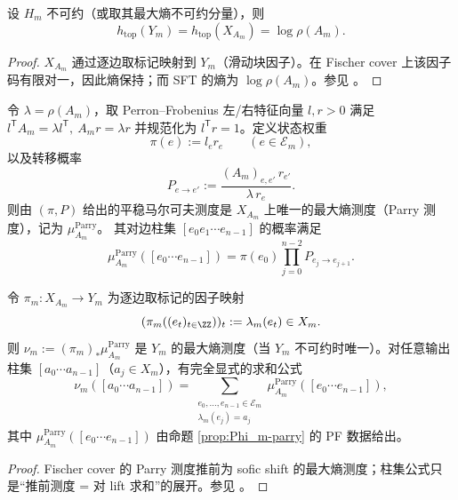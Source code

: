 \begin{proposition}[拓扑熵的可计算公式]\label{prop:Phi_m-entropy}
设 $H_m$ 不可约（或取其最大熵不可约分量），则
\[
h_{\mathrm{top}}(Y_m)=h_{\mathrm{top}}(X_{A_m})=\log\rho(A_m).
\]
\end{proposition}

\begin{proof}
$X_{A_m}$ 通过逐边取标记映射到 $Y_m$（滑动块因子）。在 Fischer cover 上该因子码有限对一，因此熵保持；而 SFT 的熵为 $\log\rho(A_m)$。参见 \cite{LindMarcus1995,Kitchens1998SymbolicDynamics}。
\end{proof}

\begin{proposition}\label{prop:Phi_m-parry}
令 $\lambda=\rho(A_m)$，取 Perron--Frobenius 左/右特征向量 $l,r>0$ 满足
\(
l^{\mathsf T}A_m=\lambda l^{\mathsf T},\ A_m r=\lambda r
\)
并规范化为 $l^{\mathsf T}r=1$。定义状态权重
\[
\pi(e):=l_e r_e\qquad (e\in\mathcal{E}_m),
\]
以及转移概率
\[
P_{e\to e'}:=\frac{(A_m)_{e,e'}\,r_{e'}}{\lambda\, r_e}.
\]
则由 $(\pi,P)$ 给出的平稳马尔可夫测度是 $X_{A_m}$ 上唯一的最大熵测度（Parry 测度），记为 $\mu_{A_m}^{\mathrm{Parry}}$。
其对边柱集 $[e_0e_1\cdots e_{n-1}]$ 的概率满足
\[
\mu_{A_m}^{\mathrm{Parry}}([e_0\cdots e_{n-1}])=\pi(e_0)\prod_{j=0}^{n-2} P_{e_j\to e_{j+1}}.
\]
\end{proposition}

\begin{proposition}\label{prop:Phi_m-parry-pushforward}
令 $\pi_m:X_{A_m}\to Y_m$ 为逐边取标记的因子映射
\[
(\pi_m((e_t)_{t\in\ZZ}))_t:=\lambda_m(e_t)\in X_m.
\]
则 $\nu_m:=({\pi_m})_*\mu_{A_m}^{\mathrm{Parry}}$ 是 $Y_m$ 的最大熵测度（当 $Y_m$ 不可约时唯一）。对任意输出柱集 $[a_0\cdots a_{n-1}]$（$a_j\in X_m$），有完全显式的求和公式
\[
\nu_m([a_0\cdots a_{n-1}])
=
\sum_{\substack{e_0,\dots,e_{n-1}\in\mathcal{E}_m\\ \lambda_m(e_j)=a_j}}
\mu_{A_m}^{\mathrm{Parry}}([e_0\cdots e_{n-1}]),
\]
其中 $\mu_{A_m}^{\mathrm{Parry}}([e_0\cdots e_{n-1}])$ 由命题 \ref{prop:Phi_m-parry} 的 PF 数据给出。
\end{proposition}

\begin{proof}
Fischer cover 的 Parry 测度推前为 sofic shift 的最大熵测度；柱集公式只是“推前测度 = 对 lift 求和”的展开。参见 \cite{LindMarcus1995,Kitchens1998SymbolicDynamics}。
\end{proof}

